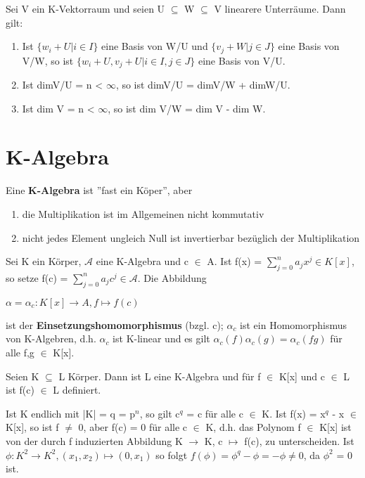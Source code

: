 \begin{lemma}
Sei V ein K-Vektorraum und seien U $\subseteq$ W $\subseteq$ V linearere Unterräume. Dann gilt:
\begin{enumerate}
\item Ist $\{w_i + U | i \in I\}$ eine Basis von W/U und $\{v_j + W | j \in J\}$ eine Basis von V/W, so ist $\{w_i +U, v_j +U | i \in I, j \in J\}$ eine Basis von V/U.
\item Ist dimV/U = n < $\infty$, so ist dimV/U = dimV/W + dimW/U.
\item Ist dim V = n < $\infty$, so ist dim V/W = dim V - dim W.
\end{enumerate}
\end{lemma}

\section{K-Algebra}
Eine \textbf{K-Algebra} ist ”fast ein Köper”, aber
\begin{enumerate}
\item die Multiplikation ist im Allgemeinen nicht kommutativ
\item nicht jedes Element ungleich Null ist invertierbar bezüglich der Multiplikation\\
\end{enumerate}

\begin{definition}
Sei K ein Körper, $\mathcal{A}$ eine K-Algebra und c $\in$ A. Ist f(x) = $\sum\nolimits_{j=0}^{n} a_j x^j \in K[x]$, so setze f(c) = $\sum\nolimits_{j=0}^{n} a_j c^j \in \mathcal{A}$. Die Abbildung
\begin{center}
$\alpha = \alpha_c: K[x] \to A, f \mapsto f(c)$
\end{center}
ist der \textbf{Einsetzungshomomorphismus} (bzgl. c); $\alpha_c$ ist ein Homomorphismus von K-Algebren, d.h. $\alpha_c$ ist K-linear und es gilt $\alpha_c(f)\alpha_c(g) = \alpha_c(fg)$ für alle f,g $\in$ K[x].
\end{definition}

\begin{example}
\leavevmode
\begin{compactenum}
\item Seien K $\subseteq$ L Körper. Dann ist L eine K-Algebra und für f $\in$ K[x] und c $\in$ L ist f(c) $\in$ L definiert.
\item Ist K endlich mit |K| = q = p$^n$, so gilt c$^q$ = c für alle c $\in$ K. Ist f(x) = x$^q$ - x $\in$ K[x], so ist f $\neq$ 0, aber f(c) = 0 für alle c $\in$ K, d.h. das Polynom f $\in$ K[x] ist von der durch f induzierten Abbildung K $\to$ K, c $\mapsto$ f(c), zu unterscheiden. Ist $\phi: K^2 \to K^2, (x_1,x_2) \mapsto (0,x_1)$ so folgt $f(\phi) = \phi^q - \phi = -\phi \neq 0$, da $\phi^2$ = 0 ist.
\end{compactenum}
\end{example}

